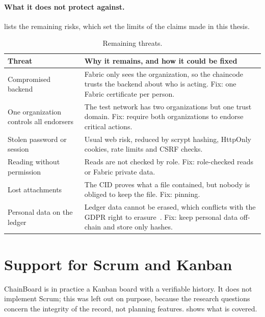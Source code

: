 \paragraph*{What it does not protect against.}  lists the remaining risks, which set the limits of the claims made in this thesis.

\begin{table}[htbp]
    \centering
    \small
    \begin{tabular}{p{3.4cm}p{8.6cm}}
        \toprule
        Threat & Why it remains, and how it could be fixed \\
        \midrule
        Compromised backend & Fabric only sees the organization, so the chaincode trusts the backend about who is acting. Fix: one Fabric certificate per person. \\
        One organization controls all endorsers & The test network has two organizations but one trust domain. Fix: require both organizations to endorse critical actions. \\
        Stolen password or session & Usual web risk, reduced by scrypt hashing, HttpOnly cookies, rate limits and CSRF checks. \\
        Reading without permission & Reads are not checked by role. Fix: role-checked reads or Fabric private data. \\
        Lost attachments & The CID proves what a file contained, but nobody is obliged to keep the file. Fix: pinning. \\
        Personal data on the ledger & Ledger data cannot be erased, which conflicts with the GDPR right to erasure~\cite{gdpr}. Fix: keep personal data off-chain and store only hashes. \\
        \bottomrule
    \end{tabular}
    \caption{Remaining threats.}
    \label{tab:threats}
\end{table}

\section{Support for Scrum and Kanban}
\label{sec:results-agile}

ChainBoard is in practice a Kanban board with a verifiable history. It does not implement Scrum; this was left out on purpose, because the research questions concern the integrity of the record, not planning features.  shows what is covered.

